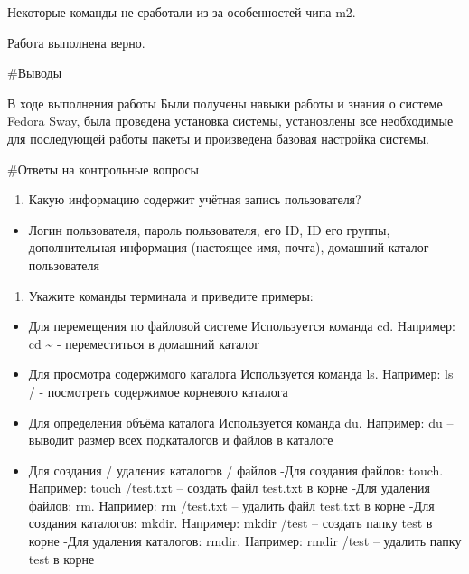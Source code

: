 Некоторые команды не сработали из-за особенностей чипа m2.

Работа выполнена верно.

\#Выводы

В ходе выполнения работы Были получены навыки работы и знания о системе
Fedora Sway, была проведена установка системы, установлены все
необходимые для последующей работы пакеты и произведена базовая
настройка системы.

\#Ответы на контрольные вопросы

\begin{enumerate}
\def\labelenumi{\arabic{enumi})}
\tightlist
\item
  Какую информацию содержит учётная запись пользователя?
\end{enumerate}

\begin{itemize}
\tightlist
\item
  Логин пользователя, пароль пользователя, его ID, ID его группы,
  дополнительная информация (настоящее имя, почта), домашний каталог
  пользователя
\end{itemize}

\begin{enumerate}
\def\labelenumi{\arabic{enumi})}
\setcounter{enumi}{1}
\tightlist
\item
  Укажите команды терминала и приведите примеры:
\end{enumerate}

\begin{itemize}
\item
  Для перемещения по файловой системе Используется команда cd. Например:
  cd \textasciitilde{} - переместиться в домашний каталог
\item
  Для просмотра содержимого каталога Используется команда ls. Например:
  ls / - посмотреть содержимое корневого каталога
\item
  Для определения объёма каталога Используется команда du. Например: du
  -- выводит размер всех подкаталогов и файлов в каталоге
\item
  Для создания / удаления каталогов / файлов -Для создания файлов:
  touch. Например: touch /test.txt -- создать файл test.txt в корне -Для
  удаления файлов: rm. Например: rm /test.txt -- удалить файл test.txt в
  корне -Для создания каталогов: mkdir. Например: mkdir /test -- создать
  папку test в корне -Для удаления каталогов: rmdir. Например: rmdir
  /test -- удалить папку test в корне
\end{itemize}

